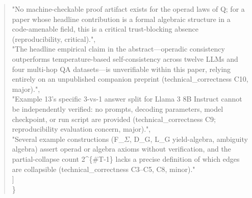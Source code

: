 \documentclass[11pt]{article}
\begin{document}
\begin{quote}
    "No machine-checkable proof artifact exists for the operad laws of Q; for a paper whose headline contribution is a formal algebraic structure in a code-amenable field, this is a critical trust-blocking absence (reproducibility, critical).",\\
    "The headline empirical claim in the abstract---operadic consistency outperforms temperature-based self-consistency across twelve LLMs and four multi-hop QA datasets---is unverifiable within this paper, relying entirely on an unpublished companion preprint (technical\_correctness C10, major).",\\
    "Example 13's specific 3-vs-1 answer split for Llama 3 8B Instruct cannot be independently verified: no prompts, decoding parameters, model checkpoint, or run script are provided (technical\_correctness C9; reproducibility evaluation concern, major).",\\
    "Several example constructions (F\_\ensuremath{\Sigma}, D\_G, L\_G yield-algebra, ambiguity algebra) assert operad or algebra axioms without verification, and the partial-collapse count 2\^{}\{\#T-1\} lacks a precise definition of which edges are collapsible (technical\_correctness C3--C5, C8, minor)."\\
  ]\\
\}\\
\end{quote}
\end{document}
